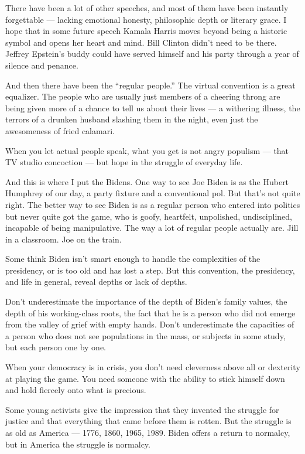 There have been a lot of other speeches, and most of them have been
instantly forgettable --- lacking emotional honesty, philosophic depth
or literary grace. I hope that in some future speech Kamala Harris moves
beyond being a historic symbol and opens her heart and mind. Bill
Clinton didn't need to be there. Jeffrey Epstein's buddy could have
served himself and his party through a year of silence and penance.

And then there have been the ``regular people.'' The virtual convention
is a great equalizer. The people who are usually just members of a
cheering throng are being given more of a chance to tell us about their
lives --- a withering illness, the terrors of a drunken husband slashing
them in the night, even just the awesomeness of fried calamari.

When you let actual people speak, what you get is not angry populism ---
that TV studio concoction --- but hope in the struggle of everyday life.

And this is where I put the Bidens. One way to see Joe Biden is as the
Hubert Humphrey of our day, a party fixture and a conventional pol. But
that's not quite right. The better way to see Biden is as a regular
person who entered into politics but never quite got the game, who is
goofy, heartfelt, unpolished, undisciplined, incapable of being
manipulative. The way a lot of regular people actually are. Jill in a
classroom. Joe on the train.

Some think Biden isn't smart enough to handle the complexities of the
presidency, or is too old and has lost a step. But this convention, the
presidency, and life in general, reveal depths or lack of depths.

Don't underestimate the importance of the depth of Biden's family
values, the depth of his working-class roots, the fact that he is a
person who did not emerge from the valley of grief with empty hands.
Don't underestimate the capacities of a person who does not see
populations in the mass, or subjects in some study, but each person one
by one.

When your democracy is in crisis, you don't need cleverness above all or
dexterity at playing the game. You need someone with the ability to
stick himself down and hold fiercely onto what is precious.

Some young activists give the impression that they invented the struggle
for justice and that everything that came before them is rotten. But the
struggle is as old as America --- 1776, 1860, 1965, 1989. Biden offers a
return to normalcy, but in America the struggle is normalcy.

